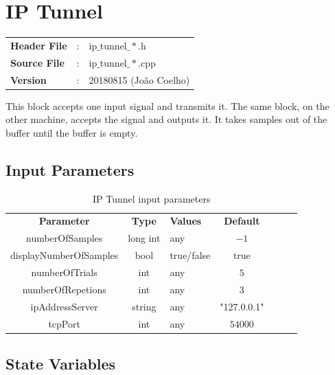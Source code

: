 \clearpage

\section{IP Tunnel}

\begin{tcolorbox}	
	\begin{tabular}{p{2.75cm} p{0.2cm} p{10.5cm}} 	
		\textbf{Header File}   &:& ip$\_$tunnel$\_*$.h \\
		\textbf{Source File}   &:& ip$\_$tunnel$\_*$.cpp \\
        \textbf{Version}       &:& 20180815 (Jo\~ao Coelho) \\
	\end{tabular}
\end{tcolorbox}

This block accepts one input signal and transmits it. The same block, on the other machine, accepts the signal and outputs it. It takes samples out of the buffer until the buffer is empty.

\subsection*{Input Parameters}

\begin{table}[h]
	\centering
	\begin{tabular}{|c|c|p{30mm}|c|ccp{60mm}}
		\cline{1-4}
		\textbf{Parameter} & \textbf{Type} & \textbf{Values} &   \textbf{Default}& \\ \cline{1-4}
		numberOfSamples & long int & any & $-1$ \\ \cline{1-4}
        displayNumberOfSamples & bool & true/false & true \\ \cline{1-4}
		numberOfTrials & int & any & $5$ \\ \cline{1-4}
		numberOfRepetions & int & any & $3$ \\ \cline{1-4}
		ipAddressServer & string & any & "127.0.0.1" \\ \cline{1-4}
		tcpPort & int & any & $54000$ \\ \cline{1-4}
	\end{tabular}
	\caption{IP Tunnel input parameters}
	\label{table:ipt_in_par}
\end{table}

\subsection*{State Variables}

